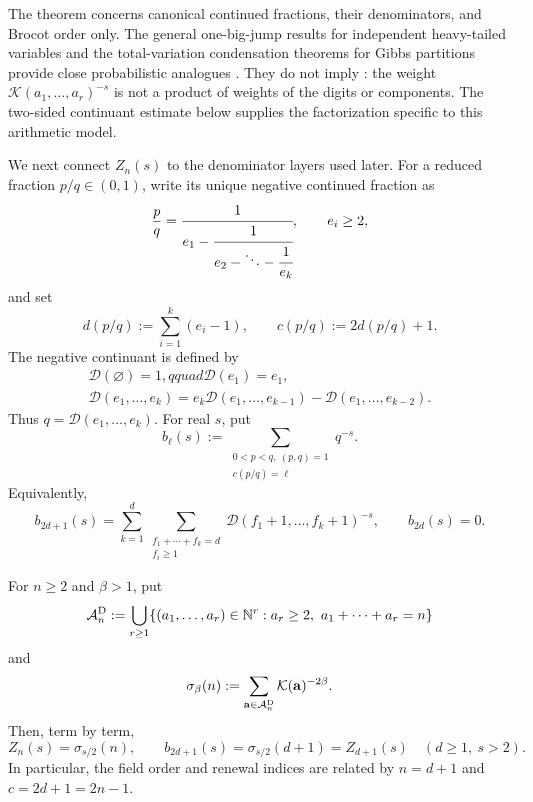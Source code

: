 The theorem concerns canonical continued fractions, their denominators, and
Brocot order only.  The general one-big-jump results for independent
heavy-tailed variables and the total-variation condensation theorems for
Gibbs partitions provide close probabilistic analogues
\cite{ArmendarizLoulakis2011,Stufler2020}.  They do not imply
: the weight
\(\mathcal K(a_1,\ldots,a_r)^{-s}\) is not a product of weights of the
digits or components.  The two-sided continuant estimate below supplies the
factorization specific to this arithmetic model.

We next connect \(Z_n(s)\) to the denominator layers used later.  For a
reduced fraction \(p/q\in(0,1)\), write its unique negative continued
fraction as
\[
 \frac pq=
 \cfrac1{e_1-\cfrac1{e_2-\ddots-\cfrac1{e_k}}},
 \qquad e_i\ge2,
\]
and set
\[
 d(p/q):=\sum_{i=1}^k(e_i-1),
 \qquad c(p/q):=2d(p/q)+1.
\]
The negative continuant is defined by
\[
 \begin{gathered}
  \mathcal D(\varnothing)=1,qquad \mathcal D(e_1)=e_1,\\
  \mathcal D(e_1,\ldots,e_k)
  =e_k\mathcal D(e_1,\ldots,e_{k-1})
   -\mathcal D(e_1,\ldots,e_{k-2}).
 \end{gathered}
\]
Thus \(q=\mathcal D(e_1,\ldots,e_k)\).  For real \(s\), put
\begin{equation}
 b_\ell(s):=
 \sum_{\substack{0<p<q,\ (p,q)=1\\c(p/q)=\ell}}q^{-s}.
 \label{eq:weighted-letter-definition}
\end{equation}
Equivalently,
\begin{equation}
 b_{2d+1}(s)
 =\sum_{k=1}^d
   \sum_{\substack{f_1+\cdots+f_k=d\\f_i\ge1}}
   \mathcal D(f_1+1,\ldots,f_k+1)^{-s},
 \qquad b_{2d}(s)=0.
 \label{eq:weighted-letter-coefficients}
\end{equation}

\begin{proposition}
\label{prop:dushistova-exact-identification}
For \(n\ge2\) and \(\beta>1\), put
\[
 \mathcal A_n^{\rm D}:=
 \bigcup_{r\ge1}\{(a_1,\ldots,a_r)\in\mathbb N^r:
                         a_r\ge2,\ a_1+\cdots+a_r=n\}
\]
and
\[
 \sigma_\beta(n):=\sum_{\mathbf a\in\mathcal A_n^{\rm D}}
                    \mathcal K(\mathbf a)^{-2\beta}.
\]
Then, term by term,
\begin{equation}
 Z_n(s)=\sigma_{s/2}(n),
 \qquad
 b_{2d+1}(s)=\sigma_{s/2}(d+1)=Z_{d+1}(s)
 \quad(d\ge1,\ s>2).
 \label{eq:dushistova-exact-identification}
\end{equation}
In particular, the field order and renewal indices are related by
\(n=d+1\) and \(c=2d+1=2n-1\).
\end{proposition}

